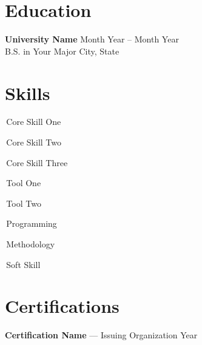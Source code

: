 \documentclass[10pt, letterpaper]{article}
\newcommand{\pill}[1]{\colorbox{accent!12}{\textcolor{accent}{\strut\,#1\,}}\hspace{3pt}}
\begin{document}
\section{Education}
{\bfseries University Name} \hfill {\small Month Year -- Month Year}\\
{\color{accent}B.S. in Your Major} \hfill {\small City, State}

\section{Skills}
\pill{Core Skill One}\pill{Core Skill Two}\pill{Core Skill Three}\pill{Tool One}\pill{Tool Two}\pill{Programming}\pill{Methodology}\pill{Soft Skill}

\section{Certifications}
{\bfseries Certification Name} --- Issuing Organization \hfill {\small Year}
\end{document}
